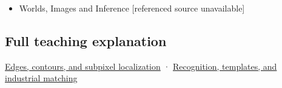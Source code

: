 \begin{itemize}
\tightlist
\item
  {Worlds, Images and Inference {[}referenced source unavailable{]}}
\end{itemize}

\subsection{Full teaching explanation}\label{appendix-a5b0383b3b3e-full-teaching-explanation}

\hyperref[04-visual-computing-ii-ch030-edges-contours-and-subpixel-localization]{Edges, contours, and subpixel localization} · \hyperref[04-visual-computing-ii-ch030-recognition-templates-and-industrial-matching]{Recognition, templates, and industrial matching}
